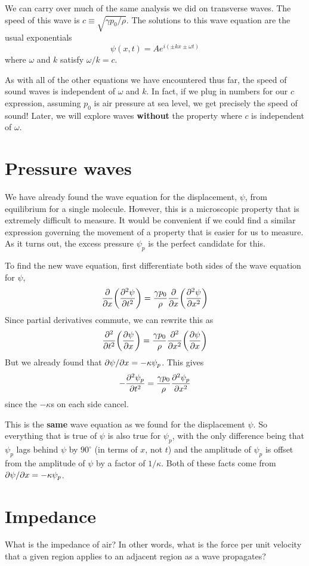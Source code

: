 We can carry over much of the same analysis we did on transverse waves. The speed of this wave is $c \equiv \sqrt{\gamma p_0/\rho}$. The solutions to this wave equation are the usual exponentials
\[ \psi(x,t) = Ae^{i(\pm kx\pm \omega t)} \]
where $\omega$ and $k$ satisfy $\omega/k = c$.

As with all of the other equations we have encountered thus far, the speed of sound waves is independent of $\omega$ and $k$. In fact, if we plug in numbers for our $c$ expression, assuming $p_0$ is air pressure at sea level, we get precisely the speed of sound! Later, we will explore waves \textbf{without} the property where $c$ is independent of $\omega$.
\section{Pressure waves}
We have already found the wave equation for the displacement, $\psi$, from equilibrium for a single molecule. However, this is a microscopic property that is extremely difficult to measure. It would be convenient if we could find a similar expression governing the movement of a property that is easier for us to measure. As it turns out, the excess pressure $\psi_p$ is the perfect candidate for this.

To find the new wave equation, first differentiate both sides of the wave equation for $\psi$,
\[ \pdv{x} \pqty{\pdv[2]{\psi}{t}} = \frac{\gamma p_0}{\rho} \pdv{x} \pqty{\pdv[2]{\psi}{x}} \]
Since partial derivatives commute, we can rewrite this as
\[ \pdv[2]{t} \pqty{\pdv{\psi}{x}} = \frac{\gamma p_0}{\rho} \pdv[2]{x} \pqty{\pdv{\psi}{x}} \]
But we already found that $\partial \psi/\partial x = -\kappa \psi_p$. This gives
\[ -\pdv[2]{\psi_p}{t} = \frac{\gamma p_0}{\rho} \pdv[2]{\psi_p}{x} \]
since the $-\kappa$s on each side cancel.

This is the \textbf{same} wave equation as we found for the displacement $\psi$. So everything that is true of $\psi$ is also true for $\psi_p$, with the only difference being that $\psi_p$ lags behind $\psi$ by $90^\circ$ (in terms of $x$, not $t$) and the amplitude of $\psi_p$ is offset from the amplitude of $\psi$ by a factor of $1/\kappa$. Both of these facts come from $\partial \psi/\partial x = -\kappa \psi_p$.
\section{Impedance}
What is the impedance of air? In other words, what is the force per unit velocity that a given region applies to an adjacent region as a wave propagates?

